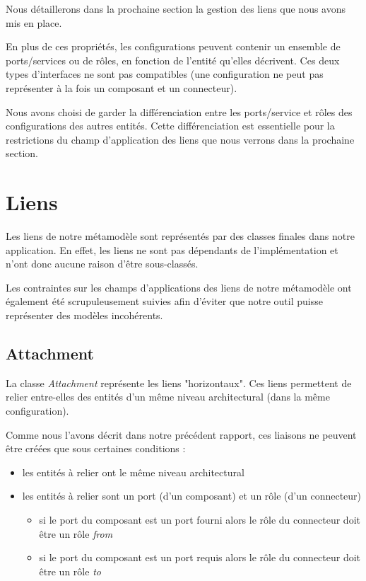             Nous détaillerons dans la prochaine section la gestion des liens que nous avons mis en place.
            \newline
            
            En plus de ces propriétés, les configurations peuvent contenir un ensemble de ports/services ou de rôles, en fonction de l'entité qu'elles décrivent. Ces deux types d'interfaces ne sont pas compatibles (une configuration ne peut pas représenter à la fois un composant et un connecteur).
            
            Nous avons choisi de garder la différenciation entre les ports/service et rôles des configurations des autres entités. Cette différenciation est essentielle pour la restrictions du champ d'application des liens que nous verrons dans la prochaine section.
            
	\section{Liens}
    
    	Les liens de notre métamodèle sont représentés par des classes finales dans notre application. En effet, les liens ne sont pas dépendants de l'implémentation et n'ont donc aucune raison d'être sous-classés.
        
        Les contraintes sur les champs d'applications des liens de notre métamodèle ont également été scrupuleusement suivies afin d'éviter que notre outil puisse représenter des modèles incohérents.
        
        \subsection{Attachment}
        	La classe \emph{Attachment} représente les liens "horizontaux". Ces liens permettent de relier entre-elles des entités d'un même niveau architectural (dans la même configuration).
            \newline
            
            Comme nous l'avons décrit dans notre précédent rapport, ces liaisons ne peuvent être créées que sous certaines conditions :
            \begin{itemize}
            	\item les entités à relier ont le même niveau architectural
            	\item les entités à relier sont un port (d'un composant) et un rôle (d'un connecteur)
                \begin{itemize}
                  \item si le port du composant est un port fourni alors le rôle du connecteur doit être un rôle \emph{from}
                  \item si le port du composant est un port requis alors le rôle du connecteur doit être un rôle \emph{to}
                \end{itemize}
            \end{itemize}
            ~\\
            
